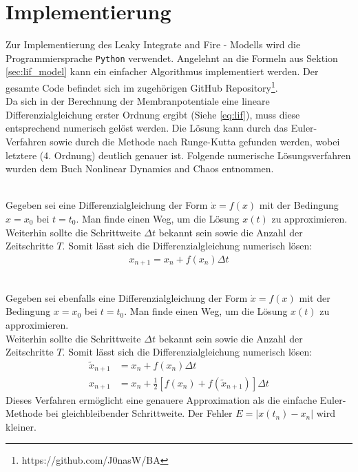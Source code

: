 \section{Implementierung}
\label{sec:lif_imp}
	Zur Implementierung des Leaky Integrate and Fire - Modells wird die Programmiersprache \texttt{Python} verwendet. Angelehnt an die Formeln aus Sektion \ref{sec:lif_model} kann ein einfacher Algorithmus implementiert werden. Der gesamte Code befindet sich im zugehörigen GitHub Repository\footnote{https://github.com/J0nasW/BA}.\\
	Da sich in der Berechnung der Membranpotentiale eine lineare Differenzialgleichung erster Ordnung ergibt (Siehe \eqref{eq:lif}), muss diese entsprechend numerisch gelöst werden. Die Lösung kann durch das Euler-Verfahren sowie durch die Methode nach Runge-Kutta gefunden werden, wobei letztere (4. Ordnung) deutlich genauer ist. Folgende numerische Lösungsverfahren wurden dem Buch \glqq Nonlinear Dynamics and Chaos\grqq{} \cite{NonlinearDynamics} entnommen.
	\begin{remark}\\
		Gegeben sei eine Differenzialgleichung der Form $\dot{x} = f(x)$ mit der Bedingung $x = x_0$ bei $t = t_0$. Man finde einen Weg, um die Lösung $x(t)$ zu approximieren.\\
		Weiterhin sollte die Schrittweite $\Delta t$ bekannt sein sowie die Anzahl der Zeitschritte $T$. Somit lässt sich die Differenzialgleichung numerisch lösen:
		\begin{align}
			\label{eq:euler}
			x_{n+1} = x_n + f(x_n) \Delta t
		\end{align}
	\end{remark}
	\begin{remark}\\
		Gegeben sei ebenfalls eine Differenzialgleichung der Form $\dot{x} = f(x)$ mit der Bedingung $x = x_0$ bei $t = t_0$. Man finde einen Weg, um die Lösung $x(t)$ zu approximieren.\\
		Weiterhin sollte die Schrittweite $\Delta t$ bekannt sein sowie die Anzahl der Zeitschritte $T$. Somit lässt sich die Differenzialgleichung numerisch lösen:
		\begin{align}
			\label{eq:erw_euler}
			\tilde{x}_{n+1} &= x_n + f(x_n) \Delta t\\
			x_{n+1} &= x_n + \tfrac{1}{2}[f(x_n) + f(\tilde{x}_{n+1})]\Delta t
		\end{align}
		Dieses Verfahren ermöglicht eine genauere Approximation als die einfache Euler-Methode bei gleichbleibender Schrittweite. Der Fehler $E = |x(t_n)-x_n|$ wird kleiner.
	\end{remark}
